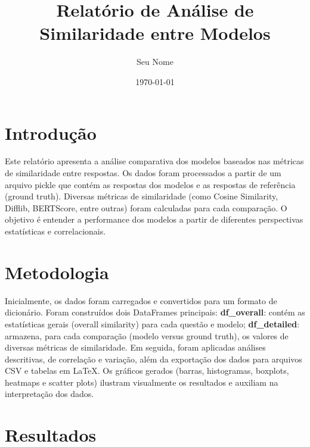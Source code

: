 \documentclass{article}%
\title{Relatório de Análise de Similaridade entre Modelos}%
\author{Seu Nome}%
\date{\today}%
\begin{document}
%
\normalsize%
\maketitle%
\tableofcontents%
\newpage%
\section*{Introdução}%
\label{sec:Introduo}%
Este relatório apresenta a análise comparativa dos modelos baseados nas métricas de similaridade entre respostas. Os dados foram processados a partir de um arquivo pickle que contém as respostas dos modelos e as respostas de referência (ground truth). Diversas métricas de similaridade (como Cosine Similarity, Difflib, BERTScore, entre outras) foram calculadas para cada comparação. O objetivo é entender a performance dos modelos a partir de diferentes perspectivas estatísticas e correlacionais.

%
\section*{Metodologia}%
\label{sec:Metodologia}%
Inicialmente, os dados foram carregados e convertidos para um formato de dicionário. Foram construídos dois DataFrames principais: \textbf{df\_overall}: contém as estatísticas gerais (overall similarity) para cada questão e modelo; \textbf{df\_detailed}: armazena, para cada comparação (modelo versus ground truth), os valores de diversas métricas de similaridade. Em seguida, foram aplicadas análises descritivas, de correlação e variação, além da exportação dos dados para arquivos CSV e tabelas em LaTeX. Os gráficos gerados (barras, histogramas, boxplots, heatmaps e scatter plots) ilustram visualmente os resultados e auxiliam na interpretação dos dados.

%
\section*{Resultados}%
\label{sec:Resultados}%
\end{document}
